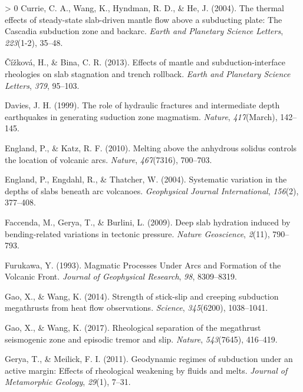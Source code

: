 \documentclass[draft,linenumbers]{agujournal2018}
\newlength{\cslhangindent}
\newenvironment{CSLReferences}[3] %
 {%
  \setlength{\parindent}{0pt}
  \ifodd #1 \everypar{\setlength{\hangindent}{\cslhangindent}}\ignorespaces\fi
  \ifnum #2 > 0
  \setlength{\parskip}{#2\baselineskip}
  \fi
 }%
 {}
\begin{document}
\begin{CSLReferences}{1}{0}
\leavevmode\hypertarget{ref-Currie2004}{}%
Currie, C. A., Wang, K., Hyndman, R. D., \& He, J. (2004). {The thermal
effects of steady-state slab-driven mantle flow above a subducting
plate: The Cascadia subduction zone and backarc}. \emph{Earth and
Planetary Science Letters}, \emph{223}(1-2), 35--48.

\leavevmode\hypertarget{ref-Cizkova2013}{}%
Čížková, H., \& Bina, C. R. (2013). {Effects of mantle and
subduction-interface rheologies on slab stagnation and trench rollback}.
\emph{Earth and Planetary Science Letters}, \emph{379}, 95--103.

\leavevmode\hypertarget{ref-Davies1999}{}%
Davies, J. H. (1999). {The role of hydraulic fractures and intermediate
depth earthquakes in generating suduction zone magmatism}.
\emph{Nature}, \emph{417}(March), 142--145.

\leavevmode\hypertarget{ref-England2010}{}%
England, P., \& Katz, R. F. (2010). Melting above the anhydrous solidus
controls the location of volcanic arcs. \emph{Nature}, \emph{467}(7316),
700--703.

\leavevmode\hypertarget{ref-England2004}{}%
England, P., Engdahl, R., \& Thatcher, W. (2004). {Systematic variation
in the depths of slabs beneath arc volcanoes}. \emph{Geophysical Journal
International}, \emph{156}(2), 377--408.

\leavevmode\hypertarget{ref-Faccenda2009}{}%
Faccenda, M., Gerya, T., \& Burlini, L. (2009). {Deep slab hydration
induced by bending-related variations in tectonic pressure}.
\emph{Nature Geoscience}, \emph{2}(11), 790--793.

\leavevmode\hypertarget{ref-Furukawa1993}{}%
Furukawa, Y. (1993). {Magmatic Processes Under Arcs and Formation of the
Volcanic Front}. \emph{Journal of Geophysical Research}, \emph{98},
8309--8319.

\leavevmode\hypertarget{ref-Gao2014}{}%
Gao, X., \& Wang, K. (2014). {Strength of stick-slip and creeping
subduction megathrusts from heat flow observations}. \emph{Science},
\emph{345}(6200), 1038--1041.

\leavevmode\hypertarget{ref-Gao2017}{}%
Gao, X., \& Wang, K. (2017). {Rheological separation of the megathrust
seismogenic zone and episodic tremor and slip}. \emph{Nature},
\emph{543}(7645), 416--419.

\leavevmode\hypertarget{ref-Gerya2011}{}%
Gerya, T., \& Meilick, F. I. (2011). Geodynamic regimes of subduction
under an active margin: Effects of rheological weakening by fluids and
melts. \emph{Journal of Metamorphic Geology}, \emph{29}(1), 7--31.


\end{CSLReferences}
\end{document}
